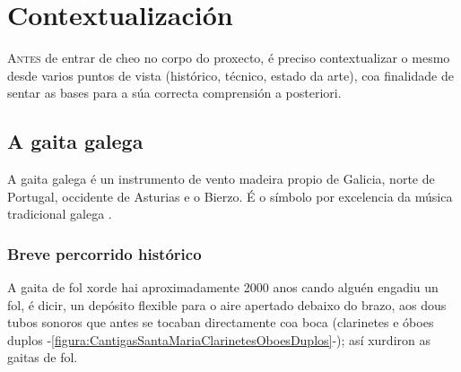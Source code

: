 \chapter{Contextualización}
\minitoc
\label{chap:contextualizacion}
\vspace{0.5cm}


\lettrine{A}{ntes} de entrar de cheo no corpo do proxecto, é preciso
contextualizar o mesmo desde varios puntos de vista (histórico, técnico,
estado da arte), coa finalidade de sentar as bases para a súa correcta
comprensión a posteriori.

\section{A gaita galega}

A gaita galega é un instrumento de vento madeira propio de Galicia, norte de
Portugal, occidente de Asturias e o Bierzo. É o símbolo por excelencia da
música tradicional galega \cite{WikipediaGaitaGalega}.

 \subsection{Breve percorrido histórico}

 A gaita de fol xorde hai aproximadamente 2000 anos cando alguén engadiu un
 fol, é dicir, un depósito flexible para o aire apertado debaixo do brazo, aos
 dous tubos sonoros que antes se tocaban directamente coa boca (clarinetes e
 óboes duplos -\ref{figura:CantigasSantaMariaClarinetesOboesDuplos}-); así
 xurdiron as gaitas de fol.

